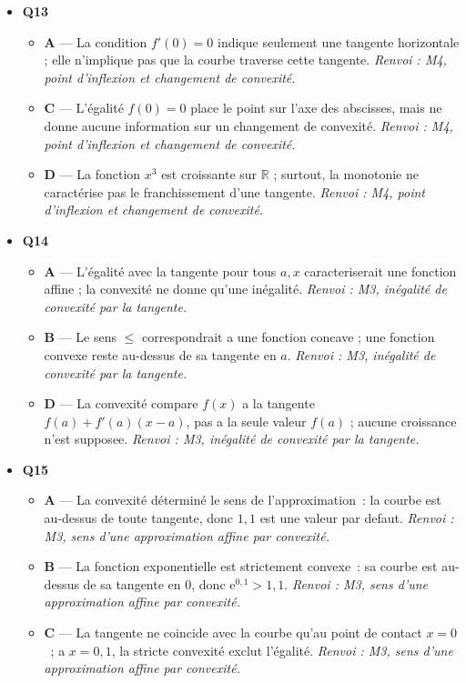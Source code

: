 \begin{itemize}
\begin{itemize}
  \end{itemize}
  \item \textbf{Q13}
  \begin{itemize}
    \item \textbf{A} — La condition $f'(0)=0$ indique seulement une tangente horizontale ; elle n'implique pas que la courbe traverse cette tangente. \emph{Renvoi : M4, point d'inflexion et changement de convexité.}
    \item \textbf{C} — L'égalité $f(0)=0$ place le point sur l'axe des abscisses, mais ne donne aucune information sur un changement de convexité. \emph{Renvoi : M4, point d'inflexion et changement de convexité.}
    \item \textbf{D} — La fonction $x^3$ est croissante sur $\mathbb{R}$ ; surtout, la monotonie ne caractérise pas le franchissement d'une tangente. \emph{Renvoi : M4, point d'inflexion et changement de convexité.}
  \end{itemize}
  \item \textbf{Q14}
  \begin{itemize}
    \item \textbf{A} — L'égalité avec la tangente pour tous $a,x$ caracteriserait une fonction affine ; la convexité ne donne qu'une inégalité. \emph{Renvoi : M3, inégalité de convexité par la tangente.}
    \item \textbf{B} — Le sens $\leq$ correspondrait a une fonction concave ; une fonction convexe reste au-dessus de sa tangente en $a$. \emph{Renvoi : M3, inégalité de convexité par la tangente.}
    \item \textbf{D} — La convexité compare $f(x)$ a la tangente $f(a)+f'(a)(x-a)$, pas a la seule valeur $f(a)$ ; aucune croissance n'est supposee. \emph{Renvoi : M3, inégalité de convexité par la tangente.}
  \end{itemize}
  \item \textbf{Q15}
  \begin{itemize}
    \item \textbf{A} — La convexité déterminé le sens de l'approximation : la courbe est au-dessus de toute tangente, donc $1{,}1$ est une valeur par defaut. \emph{Renvoi : M3, sens d'une approximation affine par convexité.}
    \item \textbf{B} — La fonction exponentielle est strictement convexe : sa courbe est au-dessus de sa tangente en $0$, donc $\mathrm{e}^{0{,}1}>1{,}1$. \emph{Renvoi : M3, sens d'une approximation affine par convexité.}
    \item \textbf{C} — La tangente ne coincide avec la courbe qu'au point de contact $x=0$ ; a $x=0{,}1$, la stricte convexité exclut l'égalité. \emph{Renvoi : M3, sens d'une approximation affine par convexité.}
  \end{itemize}
\end{itemize}
\fi
